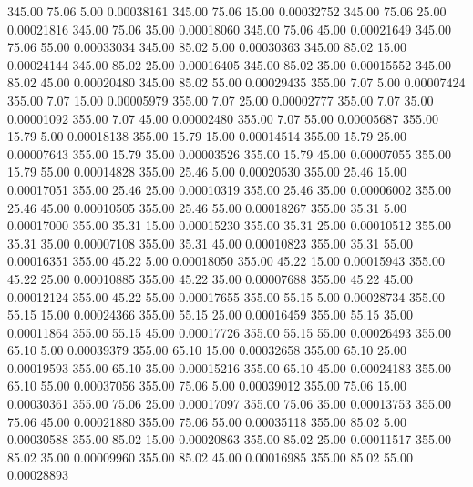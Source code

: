     345.00     75.06      5.00     0.00038161
    345.00     75.06     15.00     0.00032752
    345.00     75.06     25.00     0.00021816
    345.00     75.06     35.00     0.00018060
    345.00     75.06     45.00     0.00021649
    345.00     75.06     55.00     0.00033034
    345.00     85.02      5.00     0.00030363
    345.00     85.02     15.00     0.00024144
    345.00     85.02     25.00     0.00016405
    345.00     85.02     35.00     0.00015552
    345.00     85.02     45.00     0.00020480
    345.00     85.02     55.00     0.00029435
    355.00      7.07      5.00     0.00007424
    355.00      7.07     15.00     0.00005979
    355.00      7.07     25.00     0.00002777
    355.00      7.07     35.00     0.00001092
    355.00      7.07     45.00     0.00002480
    355.00      7.07     55.00     0.00005687
    355.00     15.79      5.00     0.00018138
    355.00     15.79     15.00     0.00014514
    355.00     15.79     25.00     0.00007643
    355.00     15.79     35.00     0.00003526
    355.00     15.79     45.00     0.00007055
    355.00     15.79     55.00     0.00014828
    355.00     25.46      5.00     0.00020530
    355.00     25.46     15.00     0.00017051
    355.00     25.46     25.00     0.00010319
    355.00     25.46     35.00     0.00006002
    355.00     25.46     45.00     0.00010505
    355.00     25.46     55.00     0.00018267
    355.00     35.31      5.00     0.00017000
    355.00     35.31     15.00     0.00015230
    355.00     35.31     25.00     0.00010512
    355.00     35.31     35.00     0.00007108
    355.00     35.31     45.00     0.00010823
    355.00     35.31     55.00     0.00016351
    355.00     45.22      5.00     0.00018050
    355.00     45.22     15.00     0.00015943
    355.00     45.22     25.00     0.00010885
    355.00     45.22     35.00     0.00007688
    355.00     45.22     45.00     0.00012124
    355.00     45.22     55.00     0.00017655
    355.00     55.15      5.00     0.00028734
    355.00     55.15     15.00     0.00024366
    355.00     55.15     25.00     0.00016459
    355.00     55.15     35.00     0.00011864
    355.00     55.15     45.00     0.00017726
    355.00     55.15     55.00     0.00026493
    355.00     65.10      5.00     0.00039379
    355.00     65.10     15.00     0.00032658
    355.00     65.10     25.00     0.00019593
    355.00     65.10     35.00     0.00015216
    355.00     65.10     45.00     0.00024183
    355.00     65.10     55.00     0.00037056
    355.00     75.06      5.00     0.00039012
    355.00     75.06     15.00     0.00030361
    355.00     75.06     25.00     0.00017097
    355.00     75.06     35.00     0.00013753
    355.00     75.06     45.00     0.00021880
    355.00     75.06     55.00     0.00035118
    355.00     85.02      5.00     0.00030588
    355.00     85.02     15.00     0.00020863
    355.00     85.02     25.00     0.00011517
    355.00     85.02     35.00     0.00009960
    355.00     85.02     45.00     0.00016985
    355.00     85.02     55.00     0.00028893
